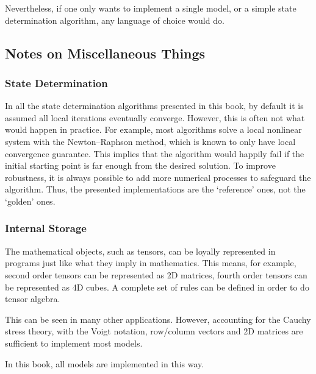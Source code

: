 Nevertheless, if one only wants to implement a single model, or a simple state determination algorithm, any language of choice would do.
\subsection{Notes on Miscellaneous Things}
\subsubsection{State Determination}
In all the state determination algorithms presented in this book, by default it is assumed all local iterations eventually converge.
However, this is often not what would happen in practice.
For example, most algorithms solve a local nonlinear system with the Newton--Raphson method, which is known to only have local convergence guarantee.
This implies that the algorithm would happily fail if the initial starting point is far enough from the desired solution.
To improve robustness, it is always possible to add more numerical processes to safeguard the algorithm.
Thus, the presented implementations are the `reference' ones, not the `golden' ones.
\subsubsection{Internal Storage}
The mathematical objects, such as tensors, can be loyally represented in programs just like what they imply in mathematics.
This means, for example, second order tensors can be represented as 2D matrices, fourth order tensors can be represented as 4D cubes.
A complete set of rules can be defined in order to do tensor algebra.

This can be seen in many other applications.
However, accounting for the Cauchy stress theory, with the Voigt notation, row/column vectors and 2D matrices are sufficient to implement most models.

In this book, all models are implemented in this way.